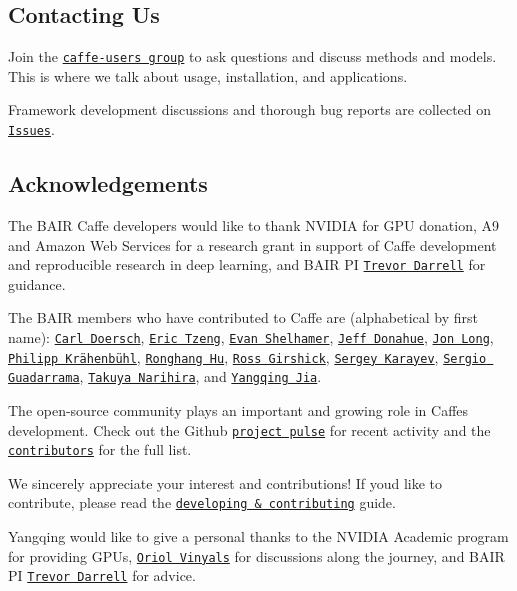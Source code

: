 \subsection*{Contacting Us}

Join the \href{https://groups.google.com/forum/#!forum/caffe-users}{\tt caffe-\/users group} to ask questions and discuss methods and models. This is where we talk about usage, installation, and applications.

Framework development discussions and thorough bug reports are collected on \href{https://github.com/BVLC/caffe/issues}{\tt Issues}.

\subsection*{Acknowledgements}

The B\+A\+IR Caffe developers would like to thank N\+V\+I\+D\+IA for G\+PU donation, A9 and Amazon Web Services for a research grant in support of Caffe development and reproducible research in deep learning, and B\+A\+IR PI \href{http://www.eecs.berkeley.edu/~trevor/}{\tt Trevor Darrell} for guidance.

The B\+A\+IR members who have contributed to Caffe are (alphabetical by first name)\+: \href{http://www.carldoersch.com/}{\tt Carl Doersch}, \href{https://github.com/erictzeng}{\tt Eric Tzeng}, \href{http://imaginarynumber.net/}{\tt Evan Shelhamer}, \href{http://jeffdonahue.com/}{\tt Jeff Donahue}, \href{https://github.com/longjon}{\tt Jon Long}, \href{http://www.philkr.net/}{\tt Philipp Krähenbühl}, \href{http://ronghanghu.com/}{\tt Ronghang Hu}, \href{http://www.cs.berkeley.edu/~rbg/}{\tt Ross Girshick}, \href{http://sergeykarayev.com/}{\tt Sergey Karayev}, \href{http://www.eecs.berkeley.edu/~sguada/}{\tt Sergio Guadarrama}, \href{https://github.com/tnarihi}{\tt Takuya Narihira}, and \href{http://daggerfs.com/}{\tt Yangqing Jia}.

The open-\/source community plays an important and growing role in Caffe\textquotesingle{}s development. Check out the Github \href{https://github.com/BVLC/caffe/pulse}{\tt project pulse} for recent activity and the \href{https://github.com/BVLC/caffe/graphs/contributors}{\tt contributors} for the full list.

We sincerely appreciate your interest and contributions! If you\textquotesingle{}d like to contribute, please read the \href{development.html}{\tt developing \& contributing} guide.

Yangqing would like to give a personal thanks to the N\+V\+I\+D\+IA Academic program for providing G\+P\+Us, \href{http://www1.icsi.berkeley.edu/~vinyals/}{\tt Oriol Vinyals} for discussions along the journey, and B\+A\+IR PI \href{http://www.eecs.berkeley.edu/~trevor/}{\tt Trevor Darrell} for advice. 